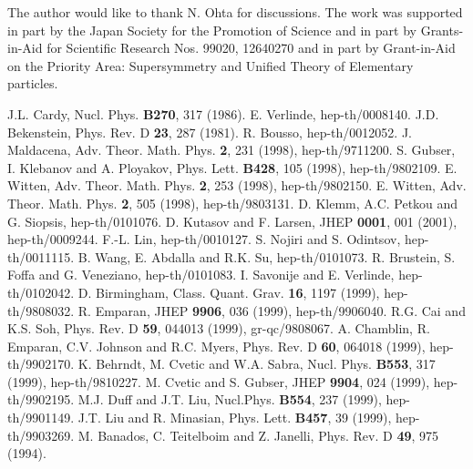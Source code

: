 \documentclass[a4paper,12pt]{article}
\begin{document}
The author would like to thank N. Ohta for discussions. 
The work  was supported in part by the Japan Society for the 
Promotion of Science and in part by Grants-in-Aid for Scientific Research
Nos. 99020, 12640270 and in part by Grant-in-Aid on the Priority Area:
Supersymmetry and Unified Theory of Elementary particles.  


\begin{thebibliography}{99}
J.L. Cardy, Nucl. Phys. {\bf B270}, 317 (1986).
E. Verlinde, hep-th/0008140.
J.D. Bekenstein, Phys. Rev. D {\bf 23}, 287 (1981).
R. Bousso, hep-th/0012052.
J. Maldacena, Adv. Theor. Math. Phys. {\bf 2}, 231 (1998),
              hep-th/9711200.
S. Gubser, I. Klebanov and A. Ployakov, Phys. Lett.
    {\bf B428}, 105 (1998), hep-th/9802109.
E. Witten, Adv. Theor. Math. Phys. {\bf 2}, 253 (1998),
     hep-th/9802150. 
E. Witten, Adv. Theor. Math. Phys. {\bf 2}, 505 (1998),
     hep-th/9803131.
D. Klemm, A.C. Petkou and G. Siopsis, hep-th/0101076.
D. Kutasov and F. Larsen, JHEP {\bf 0001}, 001 (2001),
             hep-th/0009244.
 F.-L. Lin, hep-th/0010127.
S. Nojiri and S. Odintsov, hep-th/0011115.
B. Wang, E. Abdalla and R.K. Su, hep-th/0101073.
R. Brustein, S. Foffa and G. Veneziano, hep-th/0101083.
I. Savonije and E. Verlinde, hep-th/0102042.
 D. Birmingham, Class. Quant. Grav. {\bf 16}, 1197 (1999),
               hep-th/9808032.
R. Emparan, JHEP {\bf 9906}, 036 (1999), hep-th/9906040.
R.G. Cai and K.S. Soh, Phys. Rev. D {\bf 59}, 044013 (1999),
          gr-qc/9808067.
A. Chamblin, R. Emparan, C.V. Johnson and R.C. Myers,
    Phys. Rev. D {\bf 60}, 064018 (1999), hep-th/9902170.
K. Behrndt, M. Cvetic and W.A. Sabra, Nucl. Phys. {\bf B553},
    317 (1999), hep-th/9810227.
 M. Cvetic and S. Gubser, JHEP {\bf 9904}, 024 (1999),
        hep-th/9902195.
M.J. Duff and J.T. Liu, Nucl.Phys. {\bf B554}, 237 (1999),
     hep-th/9901149.
J.T. Liu and R. Minasian, Phys. Lett. {\bf B457}, 39 (1999),
         hep-th/9903269.
M. Banados, C. Teitelboim and Z. Janelli, Phys. Rev. D {\bf 49},
    975 (1994).
\end{thebibliography}
\end{document}
